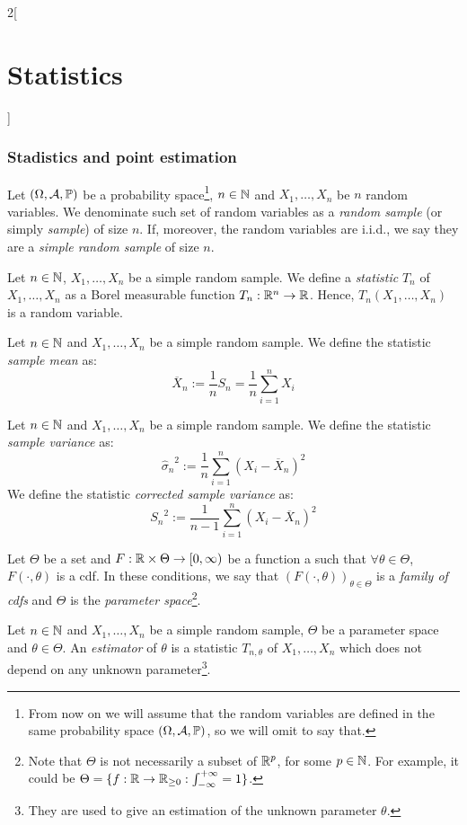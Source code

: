 \documentclass[../../../main.tex]{subfiles}
\begin{document}
\begin{multicols}{2}[\section{Statistics}]
  \subsubsection{Stadistics and point estimation}
  \begin{definition}
    Let $(\Omega,\mathcal{A},\mathbb{P})$ be a probability space\footnote{From now on we will assume that the random variables are defined in the same probability space $(\Omega,\mathcal{A},\mathbb{P})$, so we will omit to say that.}, $n\in\mathbb{N}$ and $X_1,\ldots,X_n$ be $n$ random variables. We denominate such set of random variables as a \emph{random sample} (or simply \emph{sample}) of size $n$. If, moreover, the random variables are i.i.d., we say they are a \emph{simple random sample} of size $n$.
  \end{definition}
  \begin{definition}
    Let $n\in\mathbb{N}$, $X_1,\ldots,X_n$ be a simple random sample. We define a \emph{statistic} $T_n$ of $X_1,\ldots,X_n$ as a Borel measurable function $T_n:\mathbb{R}^n\rightarrow\mathbb{R}$. Hence, $T_n(X_1,\ldots,X_n)$ is a random variable.
  \end{definition}
  \begin{definition}
    Let $n\in\mathbb{N}$ and $X_1,\ldots,X_n$ be a simple random sample. We define the statistic \emph{sample mean} as: $$\overline{X}_n:=\frac{1}{n}S_n=\frac{1}{n}\sum_{i=1}^nX_i$$
  \end{definition}
  \begin{definition}
    Let $n\in\mathbb{N}$ and $X_1,\ldots,X_n$ be a simple random sample. We define the statistic \emph{sample variance} as: $${{\hat{\sigma}}_n}^2:=\frac{1}{n}\sum_{i=1}^n{(X_i-\overline{X}_n)}^2$$ We define the statistic \emph{corrected sample variance} as: $${S_n}^2:=\frac{1}{n-1}\sum_{i=1}^n{(X_i-\overline{X}_n)}^2$$
  \end{definition}
  \begin{definition}
    Let $\Theta$ be a set and $F:\mathbb{R}\times\Theta\rightarrow[0,\infty)$ be a function a such that $\forall \theta\in\Theta$, $F(\cdot,\theta)$ is a cdf. In these conditions, we say that $(F(\cdot,\theta))_{\theta\in\Theta}$ is a \emph{family of cdfs} and $\Theta$ is the \emph{parameter space}\footnote{Note that $\Theta$ is not necessarily a subset of $\mathbb{R}^p$, for some $p\in\mathbb{N}$. For example, it could be $\Theta=\{f:\mathbb{R}\rightarrow\mathbb{R}_{\geq 0} : \int_{-\infty}^{+\infty}=1\}$.}.
  \end{definition}
  \begin{definition}
    Let $n\in\mathbb{N}$ and $X_1,\ldots,X_n$ be a simple random sample, $\Theta$ be a parameter space and $\theta\in\Theta$. An \emph{estimator} of $\theta$ is a statistic $T_{n,\theta}$ of $X_1,\ldots,X_n$ which does not depend on any unknown parameter\footnote{They are used to give an estimation of the unknown parameter $\theta$.}.

\end{definition}
\end{multicols}
\end{document}
